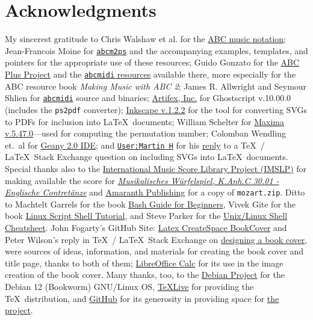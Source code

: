 \documentclass[letterpaper,x11names,svgnames,10pt]{article}
\begin{document}
\section{Acknowledgments}
My sincerest gratitude to Chris Walshaw et al. for the \href{http://www.abcnotation.com/}{ABC music notation}; Jean-Francois Moine for \href{http://moinejf.free.fr/}{\tt abcm2ps} and the accompanying examples, templates, and pointers for the appropriate use of these resources; Guido Gonzato for the \href{http://abcplus.sourceforge.net/}{ABC Plus Project} and the \href{http://abcplus.sourceforge.net/#abcMIDI}{{\tt abcmidi} resources} available there, more especially for the ABC resource book {\em Making Music with ABC 2}; James R. Allwright and Seymour Shlien for \href{http://abc.sourceforge.net/abcMIDI}{\tt abcmidi} source and binaries; \href{https://artifex.com/}{Artifex, Inc.} for Ghostscript v.10.00.0 (includes the {\tt ps2pdf} converter); \href{https://www.inkscape.org/}{Inkscape v.1.2.2} for the tool for converting SVGs to PDFs for inclusion into \LaTeX\ documents; William Schelter for \href{https://maxima.sourceforge.io}{Maxima v.5.47.0}---used for computing the permutation number; Colomban Wendling et.\ al for \href{https://www.geany.org}{Geany 2.0 IDE}; and \href{https://tex.stackexchange.com/users/632/martin-h}{\tt User:Martin H} for his \href{https://tex.stackexchange.com/questions/2099/how-to-include-svg-diagrams-in-latex}{reply} to a \TeX\ / \LaTeX\ Stack Exchange question on including SVGs into \LaTeX\ documents. Special thanks also to the \href{http://imslp.org/}{International Music Score Library Project (IMSLP)} for making available the score for \href{https://imslp.org/wiki/Musikalische_W\%C3\%BCrfelspiele\%2C_K.Anh.C.30.01_(Mozart\%2C_Wolfgang_Amadeus)}{\em Musikalisches W\"{u}rfelspiel, K.Anh.C 30.01 - Englische Contret\"{a}nze} and \href{http://www.amaranthpublishing.com/MozartDiceGame.htm}{Amaranth Publishing} for a copy of {\tt mozart.zip}. Ditto to Machtelt Garrels for the book \href{http://tldp.org/LDP/Bash-Beginners-Guide/html/Bash-Beginners-Guide.html}{Bash Guide for Beginners}, Vivek Gite for the book \href{http://www.freeos.com/guides/lsst/}{Linux Script Shell Tutorial}, and Steve Parker for the \href{http://steve-parker.org/sh/cheatsheet.pdf}{Unix/Linux Shell Cheatsheet}. John Fogarty's GitHub Site: \href{https://github.com/jfogarty/latex-createspace-bookcover}{Latex CreateSpace BookCover} and Peter Wilson's reply in \TeX\ / \LaTeX\ Stack Exchange on \href{https://tex.stackexchange.com/questions/17579/how-can-i-design-a-book-cover}{designing a book cover}, were sources of ideas, information, and materials for creating the book cover and title page, thanks to both of them; \href{http://www.libreoffice.org/}{LibreOffice Calc} for its use in the image creation of the book cover.  Many thanks, too, to the \href{https://www.debian.org}{Debian Project} for the Debian 12 (Bookworm) GNU/Linux OS, \href{http://www.tug.org/texlive/}{TeXLive} for providing the \TeX\ distribution,  and \href{https://github.com}{GitHub} for its generosity in providing space for \href{https://github.com/justineuro/mdgBookSVG1ecdKit}{the project}.  
\end{document}

